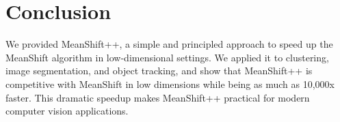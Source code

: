 \section{Conclusion}

We provided MeanShift++, a simple and principled approach to speed up the MeanShift algorithm in low-dimensional settings. We applied it to clustering, image segmentation, and object tracking, and show that MeanShift++ is competitive with MeanShift in low dimensions while being as much as 10,000x faster. This dramatic speedup makes MeanShift++ practical for modern computer vision applications. 